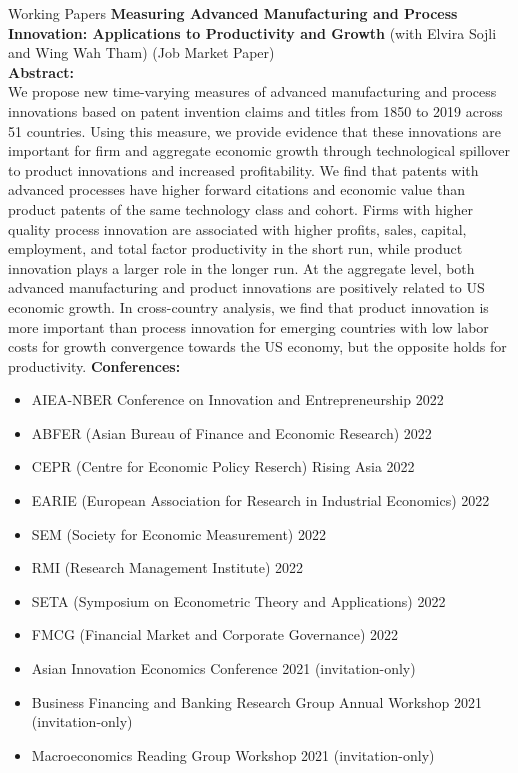 \documentclass{resume} %
\begin{document}
\begin{rSection}{Working Papers}
	{\bf Measuring Advanced Manufacturing and Process Innovation: Applications to Productivity and Growth} (with Elvira Sojli and Wing Wah Tham) (Job Market Paper)\\
	{\bf Abstract:}\\
	We propose new time-varying measures of advanced manufacturing and process innovations based on patent invention claims and titles from 1850 to 2019 across 51 countries. Using this measure, we provide evidence that these innovations are important for firm and aggregate economic growth through technological spillover to product innovations and increased profitability. We find that patents with advanced processes have higher forward citations and economic value than product patents of the same technology class and cohort. Firms with higher quality process innovation are associated with higher profits, sales, capital, employment, and total factor productivity in the short run, while product innovation plays a larger role in the longer run. At the aggregate level, both advanced manufacturing and product innovations are positively related to US economic growth. In cross-country analysis, we find that product innovation is more important than process innovation for emerging countries with low labor costs for growth convergence towards the US economy, but the opposite holds for productivity.
		{\bf Conferences:}
	\begin{itemize}
    \item AIEA-NBER Conference on Innovation and Entrepreneurship 2022
		\item ABFER (Asian Bureau of Finance and Economic Research) 2022
		\item CEPR (Centre for Economic Policy Reserch) Rising Asia 2022
		\item EARIE (European Association for Research in Industrial Economics) 2022
		\item SEM (Society for Economic Measurement) 2022
    \item RMI (Research Management Institute) 2022 
    \item SETA (Symposium on Econometric Theory and Applications) 2022
		\item FMCG (Financial Market and Corporate Governance) 2022
		\item Asian Innovation Economics Conference 2021 (invitation-only)
		\item Business Financing and Banking Research Group Annual Workshop 2021 (invitation-only)
		\item Macroeconomics Reading Group Workshop 2021 (invitation-only)
	\end{itemize}


\end{rSection}
\end{document}
